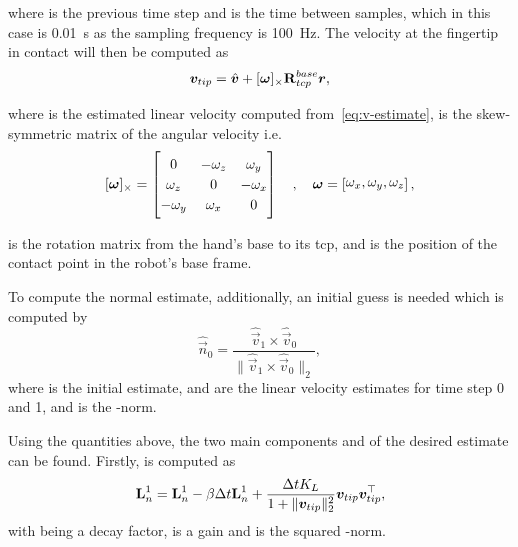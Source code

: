 where  is the previous time step and  is the time between samples, which in this case is \SI{0.01}{s} as the sampling frequency is \SI{100}{\hertz}. \medskip
The velocity at the fingertip in contact will then be computed as
%
\begin{equation} \label{eq:v-tip-def}
	\vec{v}_{tip} = \hat{\vec{v}} + [\bm{\omega}]_\times \rot[R]{base}{tcp} \vec{r},
\end{equation}

where  is the estimated linear velocity computed from~\ref{eq:v-estimate},  is the skew-symmetric matrix of the angular velocity  i.e.
%
\begin{equation} \label{eq:skew-symmetric-matrix}
	[\bm{\omega}]_\times = 
	\begin{bmatrix}
		0 & -\omega_z & \omega_y \\ \omega_z & 0 & -\omega_x \\ -\omega_y & \omega_x & 0
	\end{bmatrix} \quad , \quad \bm{\omega} = \rvec{\omega_x, \omega_y, \omega_z},
\end{equation}

 is the rotation matrix from the hand's base to its \gls{tcp}, and  is the position of the contact point in the robot's base frame. \medskip

To compute the normal estimate, additionally, an initial guess is needed which is computed by
%
\begin{equation} \label{eq:def-n-init}
	\hat{\vec{n}}_{0} = \frac{\hat{\vec{v}}_{1} \times \hat{\vec{v}}_{0}}{\| \hat{\vec{v}}_{1} \times \hat{\vec{v}}_{0} \|_2},
\end{equation}
where  is the initial estimate,  and  are the linear velocity estimates for time step \num{0} and \num{1}, and  is the -norm. \medskip

Using the quantities above, the two main components  and  of the desired estimate  can be found. Firstly,  is computed as
%
\begin{equation} \label{eq:def-L-n-1}
	\mat{L}_n^1 = \mat{L}_n^1 - \beta \Delta t \mat{L}_n^1 + \frac{\Delta t K_L}{1+\|\vec{v}_{tip}\|_2^2} \vec{v}_{tip} \vec{v}_{tip}^\T,
\end{equation}
with \mvar{\beta\inR{}} being a decay factor,  is a gain and  is the squared -norm. \medskip

